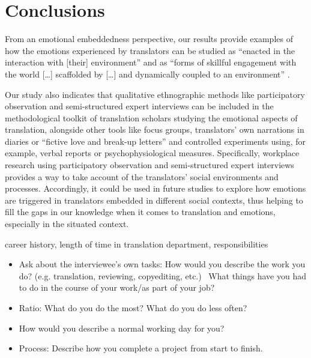\documentclass[output=paper]{langscibook}
\begin{document}
\section{Conclusions}
From an emotional embeddedness perspective, our results provide examples of how the emotions experienced by translators can be studied as “enacted in the interaction with [their] environment” \citep[285]{Wilutzky2011} and as “forms of skillful engagement with the world […] scaffolded by […] and dynamically coupled to an environment” \citep[438]{Griffiths2009}.

Our study also indicates that qualitative ethnographic methods like participatory observation and semi-structured expert interviews can be included in the methodological toolkit of translation scholars studying the emotional aspects of translation, alongside other tools like focus groups, translators’ own narrations in diaries or ``fictive love and break-up letters'' \citep{Ruokonen2017} and controlled experiments using, for example, verbal reports or psychophysiological measures. Specifically, workplace research using participatory observation and semi-structured expert interviews provides a way to take account of the translators’ social environments and processes. Accordingly, it could be used in future studies to explore how emotions are triggered in translators embedded in different social contexts, thus helping to fill the gaps in our knowledge when it comes to translation and emotions, especially in the situated context.


 \label{sec:10:appendix}

 career history, length of time in translation department, responsibilities


\begin{itemize}
\itemsep0em
    \item Ask about the interviewee’s own tasks: How would you describe the work you do? (e.g. translation, reviewing, copyediting, etc.) \rightarrow ~What things have you had to do in the course of your work/as part of your job?
    \item Ratio: What do you do the most? What do you do less often?
    \item How would you describe a normal working day for you?
    \item Process: Describe how you complete a project from start to finish.
\end{itemize}
\end{document}
